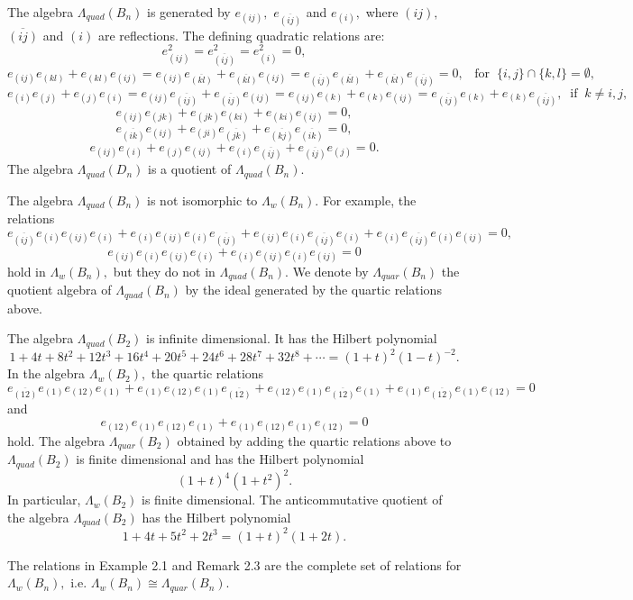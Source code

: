 \begin{ex}
{\rm The algebra $\Lambda_{quad}(B_n)$ is generated by 
$e_{(ij)},$ $e_{\overline{(ij)}}$ and $e_{(i)},$ where 
$(ij),$ $\overline{(ij)}$ and $(i)$ are reflections. 
The defining quadratic relations are: 
\[ e_{(ij)}^2=e_{\overline{(ij)}}^2=e_{(i)}^2=0, \] 
\[ e_{(ij)}e_{(kl)}+e_{(kl)}e_{(ij)}= 
e_{(ij)}e_{\overline{(kl)}}+e_{\overline{(kl)}}e_{(ij)}
=e_{\overline{(ij)}}e_{\overline{(kl)}}+
e_{\overline{(kl)}}e_{\overline{(ij)}} =0, \; \; \; 
\textrm{for} \; \; \{ i,j \} \cap \{ k,l \} = \emptyset , \] 
\[ e_{(i)}e_{(j)}+e_{(j)}e_{(i)}= 
e_{(ij)}e_{\overline{(ij)}}+e_{\overline{(ij)}}e_{(ij)}=
e_{(ij)}e_{(k)}+e_{(k)}e_{(ij)}=
e_{\overline{(ij)}}e_{(k)}+e_{(k)}e_{\overline{(ij)}}, \; \; 
\textrm{if} \; \; k\not= i,j, \]
\[ e_{(ij)}e_{(jk)}+e_{(jk)}e_{(ki)} + e_{(ki)}e_{(ij)}=0, \] 
\[  e_{\overline{(ik)}}e_{(ij)}+e_{(ji)}e_{\overline{(jk)}} + 
e_{\overline{(kj)}}e_{\overline{(ik)}}=0, \] 
\[ e_{(ij)}e_{(i)}+e_{(j)}e_{(ij)}+
e_{(i)}e_{\overline{(ij)}}+e_{\overline{(ij)}}e_{(j)}=0. \] 
The algebra $\Lambda_{quad}(D_n)$ is a quotient of 
$\Lambda_{quad}(B_n).$}
\end{ex}
\begin{rem} {\rm 
The algebra $\Lambda_{quad}(B_n)$ is not isomorphic to 
$\Lambda_w(B_n).$ For example, the relations 
\[ e_{\overline{(ij)}}e_{(i)}e_{(ij)}e_{(i)}+ 
e_{(i)}e_{(ij)}e_{(i)}e_{\overline{(ij)}}+
e_{(ij)}e_{(i)}e_{\overline{(ij)}}e_{(i)}+
e_{(i)}e_{\overline{(ij)}}e_{(i)}e_{(ij)} =0, \] 
\[ e_{(ij)}e_{(i)}e_{(ij)}e_{(i)}+ 
e_{(i)}e_{(ij)}e_{(i)}e_{(ij)} =0 \] 
hold in $\Lambda_w(B_n),$ but they do not in 
$\Lambda_{quad}(B_n).$ We denote by $\Lambda_{quar}(B_n)$ 
the quotient algebra of $\Lambda_{quad}(B_n)$ by the ideal 
generated by the quartic relations above.} 
\end{rem}
\begin{ex} {\rm 
The algebra $\Lambda_{quad}(B_2)$ is infinite dimensional. It 
has the Hilbert polynomial 
\[ 1+4t+8t^2+12t^3+16t^4+20t^5+24t^6+28t^7+32t^8+\cdots =
(1+t)^2(1-t)^{-2}. \]
In the algebra $\Lambda_w(B_2),$ the quartic relations 
\[ e_{\overline{(12)}}e_{(1)}e_{(12)}e_{(1)}+ 
e_{(1)}e_{(12)}e_{(1)}e_{\overline{(12)}}+
e_{(12)}e_{(1)}e_{\overline{(12)}}e_{(1)}+
e_{(1)}e_{\overline{(12)}}e_{(1)}e_{(12)} =0 \] 
and 
\[ e_{(12)}e_{(1)}e_{(12)}e_{(1)}+ 
e_{(1)}e_{(12)}e_{(1)}e_{(12)} =0 \] 
hold. The algebra $\Lambda_{quar}(B_2)$ obtained by adding the 
quartic relations above 
to $\Lambda_{quad}(B_2)$ is finite dimensional and has the 
Hilbert polynomial 
\[ (1+t)^4(1+t^2)^2. \] 
In particular, $\Lambda_w(B_2)$ is finite dimensional. 
The anticommutative quotient of the algebra 
$\Lambda_{quad}(B_2)$ has the Hilbert polynomial 
\[ 1+4t+5t^2+2t^3=(1+t)^2(1+2t). \] }
\end{ex}
\begin{conj} {\rm 
The relations in Example 2.1 and Remark 2.3 are the complete 
set of relations for $\Lambda_w(B_n),$ i.e. 
$\Lambda_w(B_n) \cong \Lambda_{quar}(B_n).$ } 
\end{conj}
